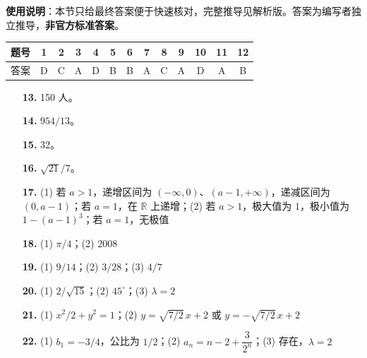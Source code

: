 
\begin{gknotice}
\textbf{使用说明}：本节只给最终答案便于快速核对，完整推导见解析版。答案为编写者独立推导，\textbf{非官方标准答案}。
\end{gknotice}

\begin{center}\begin{tabular}{ccccccccccccc}
\toprule
题号 & 1 & 2 & 3 & 4 & 5 & 6 & 7 & 8 & 9 & 10 & 11 & 12 \\
\midrule
答案 & D & C & A & D & B & B & A & C & A & D & A & B \\
\bottomrule
\end{tabular}\end{center}

\begin{itemize}[leftmargin=2.6em]
  \item[\textbf{13.}] 150 人。
  \item[\textbf{14.}] $954/13$。
  \item[\textbf{15.}] 32。
  \item[\textbf{16.}] $\sqrt{21}/7$。
\end{itemize}

\begin{itemize}[leftmargin=2.6em]
  \item[\textbf{17.}] (1) 若 $a>1$，递增区间为 $(-\infty,0)$、$(a-1,+\infty)$，递减区间为 $(0,a-1)$；若 $a=1$，在 $\mathbb R$ 上递增；(2) 若 $a>1$，极大值为 $1$，极小值为 $1-(a-1)^3$；若 $a=1$，无极值
  \item[\textbf{18.}] (1) $\pi/4$；(2) 2008
  \item[\textbf{19.}] (1) $9/14$；(2) $3/28$；(3) $4/7$
  \item[\textbf{20.}] (1) $2/\sqrt{15}$；(2) $45^\circ$；(3) $\lambda=2$
  \item[\textbf{21.}] (1) $x^2/2+y^2=1$；(2) $y=\sqrt{7/2}\,x+2$ 或 $y=-\sqrt{7/2}\,x+2$
  \item[\textbf{22.}] (1) $b_1=-3/4$，公比为 $1/2$；(2) $a_n=n-2+\dfrac3{2^n}$；(3) 存在，$\lambda=2$
\end{itemize}
